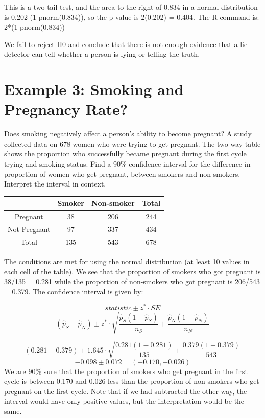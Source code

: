\documentclass[
]{book}
\begin{document}
This is a two-tail test, and the area to the right of 0.834 in a normal distribution is 0.202 (1-pnorm(0.834)), so the p-value is 2(0.202) = 0.404. The R command is: 2*(1-pnorm(0.834))

We fail to reject H0 and conclude that there is not enough evidence that a lie detector can tell whether a person is lying or telling the truth.

\hypertarget{example-3-smoking-and-pregnancy-rate}{%
\section{Example 3: Smoking and Pregnancy Rate?}\label{example-3-smoking-and-pregnancy-rate}}

Does smoking negatively affect a person's ability to become pregnant? A study collected data on 678 women who were trying to get pregnant. The two-way table shows the proportion who successfully became pregnant during the first cycle trying and smoking status. Find a 90\% confidence interval for the difference in proportion of women who get pregnant, between smokers and non-smokers. Interpret the interval in context.

\begin{tabular}{|c|c|c|c|} \hline
& {Smoker} & {Non-smoker} & {Total}\\  \hline
{Pregnant} & 38 & 206 & 244 \\ \hline
{Not Pregnant} & 97 & 337 & 434 \\ \hline
{Total} & 135 & 543 & 678 \\ \hline
\end{tabular}
\normalsize

The conditions are met for using the normal distribution (at least 10 values in each cell of the table). We see that the proportion of smokers who got pregnant is 38/135 = 0.281 while the proportion of non-smokers who got pregnant is 206/543 = 0.379. The confidence interval is given by:

\[statistic \pm z^* \cdot SE \]
\[(\hat{p}_S - \hat{p}_N) \pm z^* \cdot \sqrt{\frac{\hat{p}_S(1- \hat{p}_S)}{n_S} + \frac{\hat{p}_N(1- \hat{p}_N)}{n_N}} \]

\[(0.281 - 0.379) \pm 1.645\cdot \sqrt{\frac{0.281(1-0.281)}{135} + \frac{0.379(1-0.379)}{543}} \]
\[-0.098 \pm 0.072 = (-0.170, -0.026) \]
We are 90\% sure that the proportion of smokers who get pregnant in the first cycle is between 0.170 and 0.026 less than the proportion of non-smokers who get pregnant on the first cycle. Note that if we had subtracted the other way, the interval would have only positive values, but the interpretation would be the same.
\end{document}
